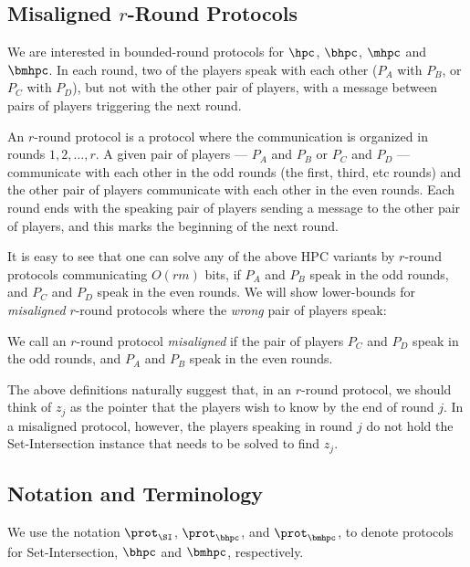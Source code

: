 \subsection{Misaligned \texorpdfstring{$r$-Round}{r-Round} Protocols}

We are interested in bounded-round protocols for $\hpc$, $\bhpc$, $\mhpc$ and $\bmhpc$. In each round, two of the players speak with each other ($P_A$ with $P_B$, or $P_C$ with $P_D$), but not with the other pair of players, with a message between pairs of players triggering the next round.

\begin{definition}\label{def:round}
An $r$-round protocol is a protocol where the communication is organized in rounds $1, 2, \ldots, r$. A given pair of players --- $P_A$ and $P_B$ or $P_C$ and $P_D$ --- communicate with each other in the odd rounds (the first, third, etc rounds) and the other pair of players communicate with each other in the even rounds. Each round ends with the speaking pair of players sending a message to the other pair of players, and this marks the beginning of the next round.
\end{definition}

It is easy to see that one can solve any of the above HPC variants by $r$-round protocols communicating $O(r m)$ bits, if $P_A$ and $P_B$ speak in the odd rounds, and $P_C$ and $P_D$ speak in the even rounds. We will show lower-bounds for \textit{misaligned} $r$-round protocols where the \textit{wrong} pair of players speak:

\begin{definition}
We call an $r$-round protocol \textit{misaligned} if the pair of players $P_C$ and $P_D$ speak in the odd rounds, and $P_A$ and $P_B$ speak in the even rounds.
\end{definition}

The above definitions naturally suggest that, in an $r$-round protocol, we should think of $z_j$ as the pointer that the players wish to know by the end of round $j$. In a misaligned protocol, however, the players speaking in round $j$ do not hold the Set-Intersection instance that needs to be solved to find $z_j$.

\subsection{Notation and Terminology}

 We use the notation $\prot_\SI$, $\prot_\bhpc$,
and $\prot_\bmhpc$, to denote protocols for Set-Intersection, $\bhpc$ and
$\bmhpc$, respectively. 

